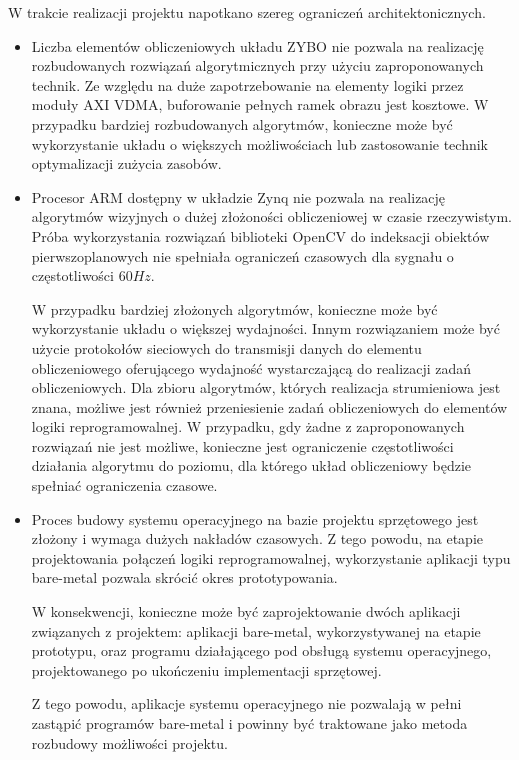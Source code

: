 W trakcie realizacji projektu napotkano szereg ograniczeń architektonicznych.
\begin{itemize}
	\item Liczba elementów obliczeniowych układu ZYBO nie pozwala na realizację rozbudowanych rozwiązań algorytmicznych przy użyciu zaproponowanych technik. Ze względu na duże zapotrzebowanie na elementy logiki przez moduły AXI VDMA, buforowanie pełnych ramek obrazu jest kosztowe. W przypadku bardziej rozbudowanych algorytmów, konieczne może być wykorzystanie układu o większych możliwościach lub zastosowanie technik optymalizacji zużycia zasobów.
	
	\item Procesor ARM dostępny w układzie Zynq nie pozwala na realizację algorytmów wizyjnych o dużej złożoności obliczeniowej w  czasie rzeczywistym. Próba wykorzystania rozwiązań biblioteki OpenCV do indeksacji obiektów pierwszoplanowych nie spełniała ograniczeń czasowych dla sygnału o częstotliwości $60Hz$.
	
	W przypadku bardziej złożonych algorytmów, konieczne może być wykorzystanie układu o większej wydajności. Innym rozwiązaniem może być użycie protokołów sieciowych do transmisji danych do elementu obliczeniowego oferującego wydajność wystarczającą do realizacji zadań obliczeniowych. Dla zbioru algorytmów, których realizacja strumieniowa jest znana, możliwe jest również przeniesienie zadań obliczeniowych do elementów logiki reprogramowalnej. W przypadku, gdy żadne z zaproponowanych rozwiązań nie jest możliwe, konieczne jest ograniczenie częstotliwości działania algorytmu do poziomu, dla którego układ obliczeniowy będzie spełniać ograniczenia czasowe.
	
	\item Proces budowy systemu operacyjnego na bazie projektu sprzętowego jest złożony i wymaga dużych nakładów czasowych. Z tego powodu, na etapie projektowania połączeń logiki reprogramowalnej, wykorzystanie aplikacji typu bare-metal pozwala skrócić okres prototypowania.
	
	W konsekwencji, konieczne może być zaprojektowanie dwóch aplikacji związanych z projektem: aplikacji bare-metal, wykorzystywanej na etapie prototypu, oraz programu działającego pod obsługą systemu operacyjnego, projektowanego po ukończeniu implementacji sprzętowej.
	
	Z tego powodu, aplikacje systemu operacyjnego nie pozwalają w pełni zastąpić programów bare-metal i powinny być traktowane jako metoda rozbudowy możliwości projektu.
\end{itemize}
